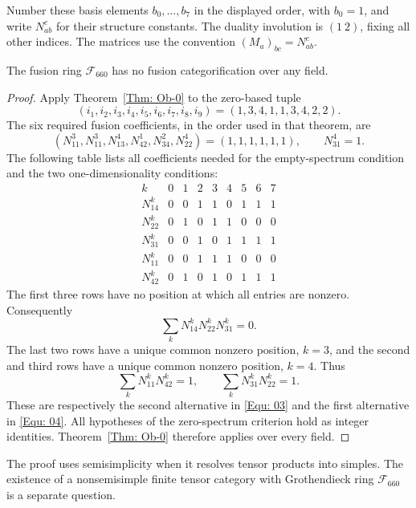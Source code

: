 \documentclass{amsart}
\begin{document}
\noindent Number these basis elements $b_0,\ldots,b_7$ in the displayed order, with $b_0=1$, and write $N_{ab}^c$ for their structure constants. The duality involution is $(1\ 2)$, fixing all other indices. The matrices use the convention $(M_a)_{bc}=N_{ab}^c$.

\begin{theorem}\label{thm:F660NoCat}
The fusion ring $\mathcal F_{660}$ has no fusion categorification over any field.
\end{theorem}

\begin{proof}
Apply Theorem~\ref{Thm: Ob-0} to the zero-based tuple
\[
 (i_1,i_2,i_3,i_4,i_5,i_6,i_7,i_8,i_9)=(1,3,4,1,1,3,4,2,2).
\]
The six required fusion coefficients, in the order used in that theorem, are
\[
 (N_{11}^{3},N_{11}^{3},N_{13}^{4},N_{42}^{1},N_{34}^{2},N_{22}^{4})=(1,1,1,1,1,1),
 \qquad N_{31}^{4}=1.
\]
The following table lists all coefficients needed for the empty-spectrum condition and the two one-dimensionality conditions:
\[
\renewcommand{\arraystretch}{1.22}
\begin{array}{c|rrrrrrrr}
 k&0&1&2&3&4&5&6&7\\\hline
 N_{14}^{k}&0&0&1&1&0&1&1&1\\
 N_{22}^{k}&0&1&0&1&1&0&0&0\\
 N_{31}^{k}&0&0&1&0&1&1&1&1\\\hline
 N_{11}^{k}&0&0&1&1&1&0&0&0\\
 N_{42}^{k}&0&1&0&1&0&1&1&1
\end{array}
\]
The first three rows have no position at which all entries are nonzero. Consequently
\[
 \sum_kN_{14}^kN_{22}^kN_{31}^k=0.
\]
The last two rows have a unique common nonzero position, $k=3$, and the second and third rows have a unique common nonzero position, $k=4$. Thus
\[
 \sum_kN_{11}^kN_{42}^k=1,\qquad
 \sum_kN_{31}^kN_{22}^k=1.
\]
These are respectively the second alternative in \eqref{Equ: 03} and the first alternative in \eqref{Equ: 04}. All hypotheses of the zero-spectrum criterion hold as integer identities. Theorem~\ref{Thm: Ob-0} therefore applies over every field.
\end{proof}



The proof uses semisimplicity when it resolves tensor products into simples. The existence of a nonsemisimple finite tensor category with Grothendieck ring $\mathcal F_{660}$ is a separate question.
\end{document}
